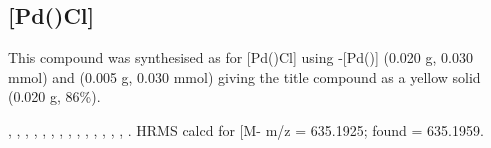 \subsection*{[Pd(\tBuxantphosk)Cl]}


This compound was synthesised as for [Pd(\tButhixantphosk)Cl] using \trans{}-[Pd(\tBuxantphos)] (0.020 g, 0.030 mmol) and  (0.005 g, 0.030 mmol) giving the title compound as a yellow solid (0.020 g, 86\%).

,
,
,
,
,
,
,
,
,
,
,
,
,
,
.
HRMS calcd for  [M-\ce{PF6]+} m/z = 635.1925; found = 635.1959.


